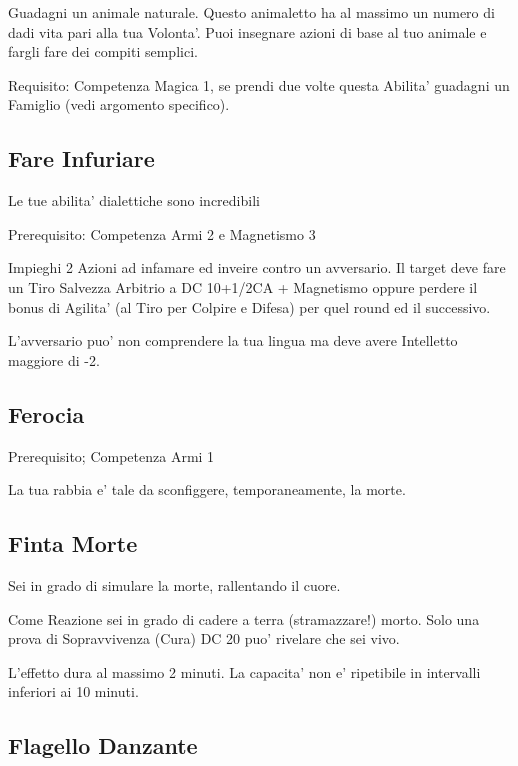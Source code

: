 \documentclass[a4paper,11pt,twoside,openany]{book}
\begin{document}
	Guadagni un animale naturale. Questo animaletto ha al massimo un numero di dadi vita pari alla tua Volonta'. Puoi insegnare azioni di base al tuo animale e fargli fare dei compiti semplici.
	
	Requisito: Competenza Magica 1, se prendi due volte questa Abilita' guadagni un Famiglio (vedi argomento specifico).
	
	\subsection{Fare Infuriare}
	
	Le tue abilita' dialettiche sono incredibili
	
	Prerequisito: Competenza Armi 2 e Magnetismo 3
	
	Impieghi 2 Azioni ad infamare ed inveire contro un avversario. Il target deve fare un Tiro Salvezza Arbitrio a DC 10+1/2CA + Magnetismo oppure perdere il bonus di Agilita' (al Tiro per Colpire e Difesa) per quel round ed il successivo.
	
	L'avversario puo' non comprendere la tua lingua ma deve avere Intelletto maggiore di -2.
	
	\subsection{Ferocia}
	
	Prerequisito; Competenza Armi 1
	
	La tua rabbia e' tale da sconfiggere, temporaneamente, la morte.
	
	\subsection{Finta Morte}
	
	Sei in grado di simulare la morte, rallentando il cuore.
	
	Come Reazione sei in grado di cadere a terra (stramazzare!) morto. Solo una prova di Sopravvivenza (Cura) DC 20 puo' rivelare che sei vivo.
	
	L'effetto dura al massimo 2 minuti. La capacita' non e' ripetibile in intervalli inferiori ai 10 minuti.
	
	\subsection{Flagello Danzante}
	
\end{document}
